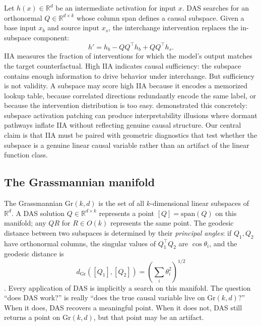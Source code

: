 \documentclass{article}
\newcommand{\Gr}{\mathrm{Gr}}
\newcommand{\R}{\mathbb{R}}
\newcommand{\dgr}{d_{\Gr}}
\newcommand{\Span}{\mathrm{span}}
\begin{document}
Let $h(x) \in \R^d$ be an intermediate activation for input $x$. DAS searches
for an orthonormal $Q \in \R^{d \times k}$ whose column span defines a causal
subspace. Given a base input $x_b$ and source input $x_s$, the interchange
intervention replaces the in-subspace component:
\begin{equation}
h' = h_b - QQ^\top h_b + QQ^\top h_s .
\label{eq:intervention}
\end{equation}
IIA measures the fraction of interventions for which the model's output matches
the target counterfactual. High IIA indicates causal sufficiency: the subspace
contains enough information to drive behavior under interchange. But sufficiency
is not validity. A subspace may score high IIA because it encodes a memorized
lookup table, because correlated directions redundantly encode the same label, or
because the intervention distribution is too easy.
\citet{makelov2024illusion} demonstrated this concretely: subspace activation
patching can produce interpretability illusions where dormant pathways inflate IIA
without reflecting genuine causal structure. Our central claim is that IIA must be
paired with geometric diagnostics that test whether the subspace is a genuine
linear causal variable rather than an artifact of the linear function class.

\subsection{The Grassmannian manifold}
\label{sec:grassmannian_background}

The Grassmannian $\Gr(k,d)$ is the set of all $k$-dimensional linear subspaces
of $\R^d$. A DAS solution $Q \in \R^{d \times k}$ represents a point
$[Q] = \Span(Q)$ on this manifold; any $QR$ for $R \in O(k)$ represents the
same point. The geodesic distance between two subspaces is determined by their
\emph{principal angles}: if $Q_1, Q_2$ have orthonormal columns, the singular
values of $Q_1^\top Q_2$ are $\cos \theta_i$, and the geodesic distance is
\begin{equation}
\dgr([Q_1],[Q_2]) = \left(\sum_i \theta_i^2\right)^{1/2}
\label{eq:geodesic}
\end{equation}
\citep{edelman1998geometry, absil2008optimization}. Every application of DAS is
implicitly a search on this manifold. The question ``does DAS work?'' is
really ``does the true causal variable live on $\Gr(k,d)$?'' When it does, DAS
recovers a meaningful point. When it does not, DAS still returns a point on
$\Gr(k,d)$, but that point may be an artifact.
\end{document}
